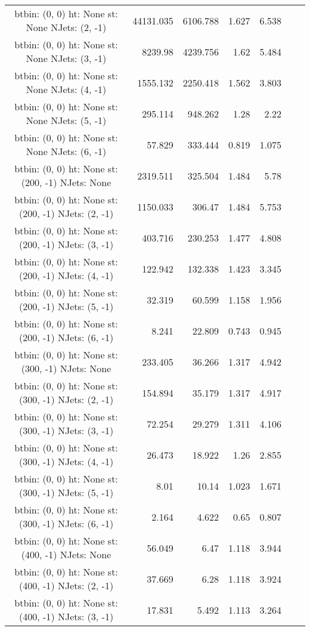\documentclass[12pt]{paper}
\begin{document}
\begin{landscape}
\begin{longtable}{c|r|r|r|r|r|r}
btbin:  (0, 0) ht:  None st:  None NJets:  (2, -1)
 & 44131.035 & 6106.788 & 1.627 & 6.538\\
btbin:  (0, 0) ht:  None st:  None NJets:  (3, -1)
 & 8239.98 & 4239.756 & 1.62 & 5.484\\
btbin:  (0, 0) ht:  None st:  None NJets:  (4, -1)
 & 1555.132 & 2250.418 & 1.562 & 3.803\\
btbin:  (0, 0) ht:  None st:  None NJets:  (5, -1)
 & 295.114 & 948.262 & 1.28 & 2.22\\
btbin:  (0, 0) ht:  None st:  None NJets:  (6, -1)
 & 57.829 & 333.444 & 0.819 & 1.075\\
btbin:  (0, 0) ht:  None st:  (200, -1) NJets:  None
 & 2319.511 & 325.504 & 1.484 & 5.78\\
btbin:  (0, 0) ht:  None st:  (200, -1) NJets:  (2, -1)
 & 1150.033 & 306.47 & 1.484 & 5.753\\
btbin:  (0, 0) ht:  None st:  (200, -1) NJets:  (3, -1)
 & 403.716 & 230.253 & 1.477 & 4.808\\
btbin:  (0, 0) ht:  None st:  (200, -1) NJets:  (4, -1)
 & 122.942 & 132.338 & 1.423 & 3.345\\
btbin:  (0, 0) ht:  None st:  (200, -1) NJets:  (5, -1)
 & 32.319 & 60.599 & 1.158 & 1.956\\
btbin:  (0, 0) ht:  None st:  (200, -1) NJets:  (6, -1)
 & 8.241 & 22.809 & 0.743 & 0.945\\
btbin:  (0, 0) ht:  None st:  (300, -1) NJets:  None
 & 233.405 & 36.266 & 1.317 & 4.942\\
btbin:  (0, 0) ht:  None st:  (300, -1) NJets:  (2, -1)
 & 154.894 & 35.179 & 1.317 & 4.917\\
btbin:  (0, 0) ht:  None st:  (300, -1) NJets:  (3, -1)
 & 72.254 & 29.279 & 1.311 & 4.106\\
btbin:  (0, 0) ht:  None st:  (300, -1) NJets:  (4, -1)
 & 26.473 & 18.922 & 1.26 & 2.855\\
btbin:  (0, 0) ht:  None st:  (300, -1) NJets:  (5, -1)
 & 8.01 & 10.14 & 1.023 & 1.671\\
btbin:  (0, 0) ht:  None st:  (300, -1) NJets:  (6, -1)
 & 2.164 & 4.622 & 0.65 & 0.807\\
btbin:  (0, 0) ht:  None st:  (400, -1) NJets:  None
 & 56.049 & 6.47 & 1.118 & 3.944\\
btbin:  (0, 0) ht:  None st:  (400, -1) NJets:  (2, -1)
 & 37.669 & 6.28 & 1.118 & 3.924\\
btbin:  (0, 0) ht:  None st:  (400, -1) NJets:  (3, -1)
 & 17.831 & 5.492 & 1.113 & 3.264\\

\end{longtable}
\end{landscape}
\end{document}
